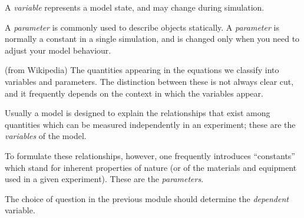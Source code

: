 
\begin{definition}

A \emph{variable} represents a model state, and may change during simulation.

A \emph{parameter} is commonly used to describe objects statically. A \emph{parameter} is normally a constant in a single simulation, and is changed only when you need to adjust your model behaviour. 
\end{definition}




\begin{annotation}
	\begin{goals}
	\end{goals}
\end{annotation}
\begin{note}{(from Wikipedia)}
The quantities appearing in the equations we classify into variables and parameters. The distinction between these is not always clear cut, and it frequently depends on the context in which the variables appear. 

Usually a model is designed to explain the relationships that exist among quantities which can be measured independently in an experiment; these are the \emph{variables} of the model. 

To formulate these relationships, however, one frequently introduces ``constants'' which stand for inherent properties of nature (or of the materials and equipment used in a given experiment). These are the \emph{parameters}.	
\end{note}









The choice of question in the previous module should determine the \emph{dependent} variable.

%
%
%




